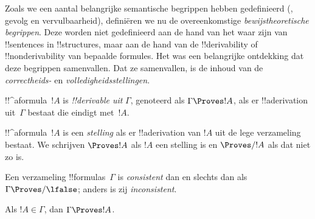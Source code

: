\documentclass[openany]{memoir}
\begin{document}
\begingroup
\def\olfilename{OLP-0118}
\def\olfilepath{content/first-order-logic/axiomatic-deduction/}
\hypertarget{unit-OLP-0118}{}



      {}
      {}


\begin{explain}
Zoals we een aantal belangrijke semantische begrippen hebben
gedefinieerd (, gevolg en
vervulbaarheid), definiëren we nu de overeenkomstige
\emph{bewijstheoretische begrippen}. Deze worden niet gedefinieerd aan
de hand van het waar zijn van !!{sentence}s in !!{structure}s, maar aan
de hand van de !!{derivability} of !!{nonderivability} van bepaalde
formules. Het was een belangrijke ontdekking dat deze begrippen
samenvallen. Dat ze samenvallen, is de inhoud van de
\emph{correctheids-} en \emph{volledigheidsstellingen}.
\end{explain}

\begin{defn}[!!^{derivability}]
!!^a{formula}~$!A$ is \emph{!!{derivable} uit} $\Gamma$, genoteerd als
$\Gamma \Proves !A$, als er !!a{derivation} uit~$\Gamma$ bestaat die
eindigt met~$!A$.
\end{defn}

\begin{defn}[Stellingen]
!!^a{formula}~$!A$ is een \emph{stelling} als er !!a{derivation} van
$!A$ uit de lege verzameling bestaat. We schrijven $\Proves !A$ als
$!A$ een stelling is en $\Proves/ !A$ als dat niet zo is.
\end{defn}

\begin{defn}[Consistentie]
Een verzameling !!{formula}s~$\Gamma$ is \emph{consistent} dan en
slechts dan als $\Gamma\Proves/ \lfalse$; anders is zij
\emph{inconsistent}.
\end{defn}

\begin{prop}[Reflexiviteit]
Als $!A \in \Gamma$, dan $\Gamma \Proves !A$.
\end{prop}
\end{document}
